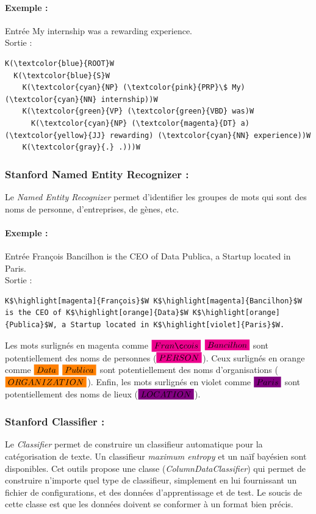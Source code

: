                 \paragraph{Exemple :}
                Entrée \og My internship was a rewarding experience.\fg\\
                Sortie :
\begin{lstlisting}
K(\textcolor{blue}{ROOT}W
  K(\textcolor{blue}{S}W
    K(\textcolor{cyan}{NP} (\textcolor{pink}{PRP}\$ My) (\textcolor{cyan}{NN} internship))W
    K(\textcolor{green}{VP} (\textcolor{green}{VBD} was)W
      K(\textcolor{cyan}{NP} (\textcolor{magenta}{DT} a) (\textcolor{yellow}{JJ} rewarding) (\textcolor{cyan}{NN} experience))W
    K(\textcolor{gray}{.} .)))W
\end{lstlisting}

            \subsubsection{Stanford Named Entity Recognizer :}
                Le \textit{Named Entity Recognizer} permet d'identifier les groupes de mots qui sont des noms de personne, d'entreprises, de gènes, etc.

                \paragraph{Exemple :}
                Entrée \og François Bancilhon is the CEO of Data Publica, a Startup located in Paris.\fg\\
                Sortie :
\begin{lstlisting}
K$\highlight[magenta]{François}$W K$\highlight[magenta]{Bancilhon}$W is the CEO of K$\highlight[orange]{Data}$W K$\highlight[orange]{Publica}$W, a Startup located in K$\highlight[violet]{Paris}$W.
\end{lstlisting}
                Les mots surlignés en magenta comme $\highlight[magenta]{François}$ $\highlight[magenta]{Bancilhon}$ sont potentiellement des noms de personnes (\textit{$\highlight[magenta]{PERSON}$}). Ceux surlignés en orange comme $\highlight[orange]{Data}$ $\highlight[orange]{Publica}$ sont potentiellement des noms d'organisations (\textit{$\highlight[orange]{ORGANIZATION}$}). Enfin, les mots surlignés en violet comme $\highlight[violet]{Paris}$ sont potentiellement des noms de lieux (\textit{$\highlight[violet]{LOCATION}$}).

            \subsubsection{Stanford Classifier :}
                Le \textit{Classifier} permet de construire un classifieur automatique pour la catégorisation de texte. Un classifieur \textit{maximum entropy} et un naïf bayésien sont disponibles. Cet outils propose une classe (\textit{ColumnDataClassifier}) qui permet de construire n'importe quel type de classifieur, simplement en lui fournissant un fichier de configurations, et des données d'apprentissage et de test. Le soucis de cette classe est que les données doivent se conformer à un format bien précis.

